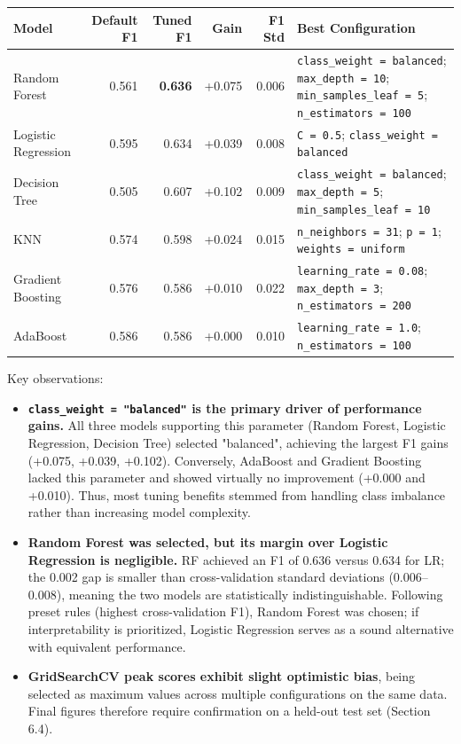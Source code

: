 \begin{center}
\small
\begin{tabularx}{\textwidth}{l r r r r X}
\toprule
\textbf{Model} & \textbf{Default F1} & \textbf{Tuned F1} & \textbf{Gain} & \textbf{F1 Std} & \textbf{Best Configuration} \\
\midrule
Random Forest & 0.561 & \textbf{0.636} & +0.075 & 0.006 & \texttt{class\_weight = balanced}; \texttt{max\_depth = 10}; \texttt{min\_samples\_leaf = 5}; \texttt{n\_estimators = 100} \\
\addlinespace
Logistic Regression & 0.595 & 0.634 & +0.039 & 0.008 & \texttt{C = 0.5}; \texttt{class\_weight = balanced} \\
\addlinespace
Decision Tree & 0.505 & 0.607 & +0.102 & 0.009 & \texttt{class\_weight = balanced}; \texttt{max\_depth = 5}; \texttt{min\_samples\_leaf = 10} \\
\addlinespace
KNN & 0.574 & 0.598 & +0.024 & 0.015 & \texttt{n\_neighbors = 31}; \texttt{p = 1}; \texttt{weights = uniform} \\
\addlinespace
Gradient Boosting & 0.576 & 0.586 & +0.010 & 0.022 & \texttt{learning\_rate = 0.08}; \texttt{max\_depth = 3}; \texttt{n\_estimators = 200} \\
\addlinespace
AdaBoost & 0.586 & 0.586 & +0.000 & 0.010 & \texttt{learning\_rate = 1.0}; \texttt{n\_estimators = 100} \\
\bottomrule
\end{tabularx}
\end{center}

Key observations:

\begin{itemize}
    \item \textbf{\texttt{class\_weight = "balanced"} is the primary driver of performance gains.} All three models supporting this parameter (Random Forest, Logistic Regression, Decision Tree) selected "balanced", achieving the largest F1 gains (+0.075, +0.039, +0.102). Conversely, AdaBoost and Gradient Boosting lacked this parameter and showed virtually no improvement (+0.000 and +0.010). Thus, most tuning benefits stemmed from handling class imbalance rather than increasing model complexity.
    \item \textbf{Random Forest was selected, but its margin over Logistic Regression is negligible.} RF achieved an F1 of 0.636 versus 0.634 for LR; the 0.002 gap is smaller than cross-validation standard deviations (0.006–0.008), meaning the two models are statistically indistinguishable. Following preset rules (highest cross-validation F1), Random Forest was chosen; if interpretability is prioritized, Logistic Regression serves as a sound alternative with equivalent performance.
    \item \textbf{GridSearchCV peak scores exhibit slight optimistic bias}, being selected as maximum values across multiple configurations on the same data. Final figures therefore require confirmation on a held-out test set (Section 6.4).
\end{itemize}

